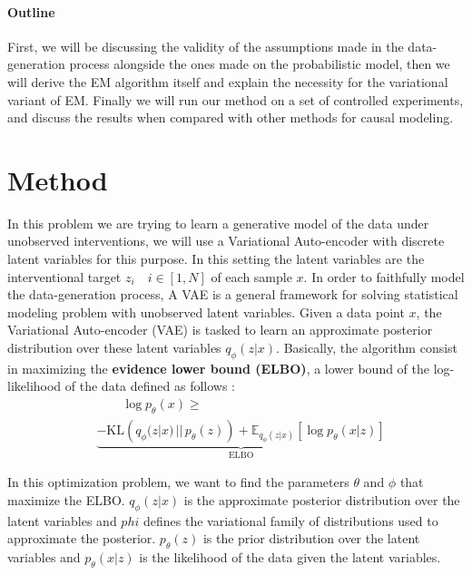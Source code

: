 \documentclass{article}
\begin{document}
\paragraph{Outline} First, we will be discussing the validity of the assumptions made in the data-generation process alongside the ones made on the probabilistic model, then we will derive the EM algorithm itself and explain the necessity for the variational variant of EM. Finally we will run our method on a set of controlled experiments, and discuss the results when compared with other methods for causal modeling.


\section{Method}\label{subsec:Method}

In this problem we are trying to learn a generative model of the data under unobserved interventions, we will use a Variational Auto-encoder \citep{kingma2022autoencodingvariationalbayes}
with discrete latent variables for this purpose. In this setting the latent variables are the interventional target $z_i \quad i \in [1,N]$ of each sample $x$. In order to faithfully model the data-generation process,
A VAE is a general framework for solving statistical modeling problem with unobserved latent variables. Given a data point $x$, the Variational Auto-encoder (VAE) is tasked to learn an approximate posterior distribution over these latent variables $q_\phi(z | x)$. Basically, the algorithm consist in maximizing the \textbf{evidence lower bound (ELBO)}, a lower bound of the log-likelihood of the data defined as follows :
\begin{align*}
    &\quad\quad \log p_\theta(x) \geq  \\
    & \underbrace{ - \text{KL}\left(q_\phi(z | x) \,||\, p_\theta(z)\right)+ \mathbb{E}_{q_\phi(z | x)} \left[ \log p_\theta(x | z) \right]}_{\text{ELBO}}
\end{align*}

In this optimization problem, we want to find the parameters $\theta$ and $\phi$ that maximize the ELBO. $q_\phi(z | x)$ is the approximate posterior distribution over the latent variables and $phi$ defines the variational family of distributions used to approximate the posterior. $p_\theta(z)$ is the prior distribution over the latent variables and $p_\theta(x | z)$ is the likelihood of the data given the latent variables.
\end{document}
